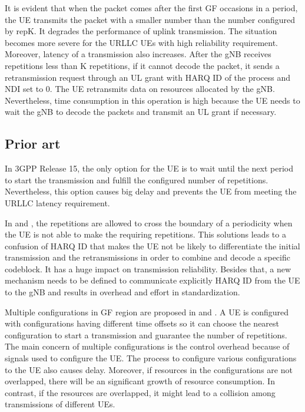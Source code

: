 \documentclass[conference]{IEEEtran}
\begin{document}
It is evident that when the packet comes after the first GF occasions in a period, the UE transmits the packet with a smaller number than the number configured by repK. It degrades the performance of uplink transmission. The situation becomes more severe for the URLLC UEs with high reliability requirement. Moreover, latency of a transmission also increases. After the gNB receives repetitions less than K repetitions, if it cannot decode the packet, it sends a retransmission request through an UL grant with HARQ ID of the process and NDI set to 0. The UE retransmits data on resources allocated by the gNB. Nevertheless, time consumption in this operation is high because the UE needs to wait the gNB to decode the packets and transmit an UL grant if necessary.

\subsection{Prior art}\label{ICC}
In 3GPP Release 15, the only option for the UE is to wait until the next period to start the transmission and fulfill the configured number of repetitions. Nevertheless, this option causes big delay and prevents the UE from meeting the URLLC latency requirement. 

In \cite{b1} and \cite{b2}, the repetitions are allowed to cross the boundary of a periodicity when the UE is not able to make the requiring repetitions. This solutions leads to a confusion of HARQ ID that makes the UE not be likely to differentiate the initial transmission and the retransmissions in order to combine and decode a specific codeblock. It has a huge impact on transmission reliability. Besides that, a new mechanism needs to be defined to communicate explicitly HARQ ID from the UE to the gNB and results in overhead and effort in standardization.  

Multiple configurations in GF region are proposed in \cite{b3} and \cite{b4}. A UE is configured with configurations having different time offsets so it can choose the nearest configuration to start a transmission and guarantee the number of repetitions. The main concern of multiple configurations is the control overhead because of signals used to configure the UE. The process to configure various configurations to the UE also causes delay. Moreover, if resources in the configurations are not overlapped, there will be an significant growth of resource consumption. In contrast, if the resources are overlapped, it might lead to a collision among transmissions of different UEs.
\end{document}
